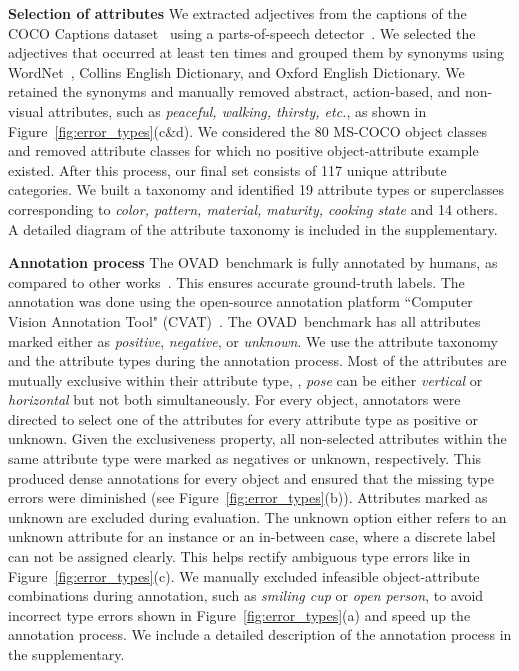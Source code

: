 \documentclass[10pt,twocolumn,letterpaper]{article}
\renewcommand\paragraph[1]{\vspace{0.12cm}\noindent\textbf{#1}}
\newcommand{\datasetname}{OVAD}
\begin{document}
 
\paragraph{Selection of attributes}
We extracted adjectives from the captions of the COCO Captions dataset~\cite{cocoCaptions} using a parts-of-speech detector~\cite{nltk}. We selected the adjectives that occurred at least ten times and grouped them by synonyms using WordNet~\cite{wordnet}, Collins English Dictionary, and Oxford English Dictionary. 
We retained the synonyms and manually removed abstract, action-based, and non-visual attributes, such as \textit{peaceful, walking, thirsty, etc.}, as shown in Figure~\ref{fig:error_types}(c\&d). 
We considered the 80 MS-COCO object classes and removed attribute classes for which no positive object-attribute example existed. After this process, our final set consists of 117 unique attribute categories. 
We built a taxonomy and identified 19 attribute types or superclasses corresponding to \textit{color, pattern, material, maturity, cooking state} and 14 others. A detailed diagram of the attribute taxonomy is included in the supplementary.


\paragraph{Annotation process} The \datasetname\ benchmark is fully annotated by humans, as compared to other works~\cite{coco_attributes, vaw, visual_genome}. This ensures accurate ground-truth labels. The annotation was done using the open-source annotation platform ``Computer Vision Annotation Tool" (CVAT)~\cite{cvat}. The \datasetname\ benchmark has all attributes marked either as \textit{positive}, \textit{negative}, or \textit{unknown}. We use the attribute taxonomy and the attribute types during the annotation process. Most of the attributes are mutually exclusive within their attribute type, \eg, \textit{pose} can be either \textit{vertical} or \textit{horizontal} but not both simultaneously. For every object, annotators were directed to select one of the attributes for every attribute type as positive or unknown. Given the exclusiveness property, all non-selected attributes within the same attribute type were marked as negatives or unknown, respectively. 
This produced dense annotations for every object and ensured that the missing type errors were diminished (see Figure~\ref{fig:error_types}(b)). 
Attributes marked as unknown are excluded during evaluation. The unknown option either refers to an unknown attribute for an instance or an in-between case, where a discrete label can not be assigned clearly. This helps rectify ambiguous type errors like in Figure~\ref{fig:error_types}(c). 
We manually excluded infeasible object-attribute combinations during annotation, such as \textit{smiling cup} or \textit{open person}, to avoid incorrect type errors shown in Figure~\ref{fig:error_types}(a) and speed up the annotation process. 
We include a detailed description of the annotation process in the supplementary.
\end{document}
